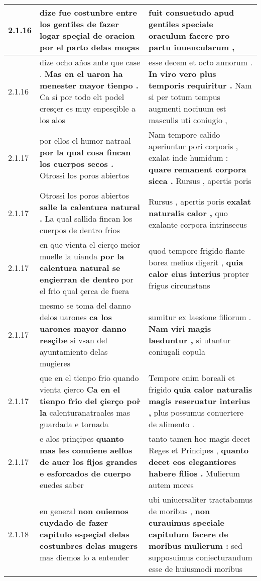 \begin{tabular}{|p{1cm}|p{6.5cm}|p{6.5cm}|}
2.1.16 & dize fue costunbre entre los gentiles \textbf{ de fazer logar speçial de oracion } por el parto delas moças & fuit consuetudo apud gentiles \textbf{ speciale oraculum facere } pro partu iuuencularum , \\\hline
2.1.16 & dize ocho años ante que case . \textbf{ Mas en el uaron ha menester mayor tienpo . } Ca si por todo elt podel cresçer es muy enpesçible a los alos & esse decem et octo annorum . \textbf{ In viro vero plus temporis requiritur . } Nam si per totum tempus augmenti nociuum est masculis uti coniugio , \\\hline
2.1.17 & por ellos el humor natraal \textbf{ por la qual cosa fincan los cuerpos secos . } Otrossi los poros abiertos & Nam tempore calido aperiuntur pori corporis , exalat inde humidum : \textbf{ quare remanent corpora sicca . } Rursus , apertis poris \\\hline
2.1.17 & Otrossi los poros abiertos \textbf{ salle la calentura natural . } La qual sallida fincan los cuerpos de dentro frios & Rursus , apertis poris \textbf{ exalat naturalis calor , } quo exalante corpora intrinsecus \\\hline
2.1.17 & en que vienta el cierço meior muelle la uianda \textbf{ por la calentura natural se ençierran de dentro } por el frio qual çerca de fuera & quod tempore frigido flante borea melius digerit , \textbf{ quia calor eius interius } propter frigus circunstans \\\hline
2.1.17 & mesmo se toma del danno delos uarones \textbf{ ca los uarones mayor danno resçibe } si vsan del ayuntamiento delas mugieres & sumitur ex laesione filiorum . \textbf{ Nam viri magis laeduntur , } si utantur coniugali copula \\\hline
2.1.17 & que en el tienpo frio quando vienta çierco \textbf{ Ca en el tienpo frio del çierço por̉ la } calenturanatraales mas guardada e tornada & Tempore enim boreali et frigido \textbf{ quia calor naturalis magis reseruatur interius , } plus possumus conuertere de alimento . \\\hline
2.1.17 & e alos prinçipes \textbf{ quanto mas les conuiene aellos de auer los fijos grandes e esforcados de cuerpo } euedes saber & tanto tamen hoc magis decet Reges et Principes , \textbf{ quanto decet eos elegantiores habere filios . } Mulierum autem mores \\\hline
2.1.18 & en general \textbf{ non ouiemos cuydado de fazer capitulo espeçial delas costunbres delas mugers } mas diemos lo a entender & ubi uniuersaliter tractabamus de moribus , \textbf{ non curauimus speciale capitulum facere de moribus mulierum : } sed supposuimus coniecturandum esse de huiusmodi moribus \\\hline

\end{tabular}
